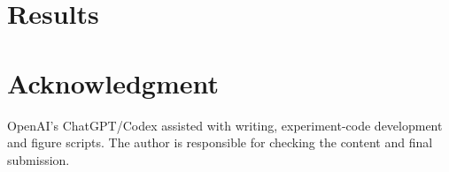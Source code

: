 \documentclass[10pt,journal,letterpaper]{IEEEtran}
\begin{document}


\section{Results}



\section*{Acknowledgment}
OpenAI's ChatGPT/Codex assisted with writing, experiment-code development and figure scripts. The author is responsible for checking the content and final submission.


\end{document}
